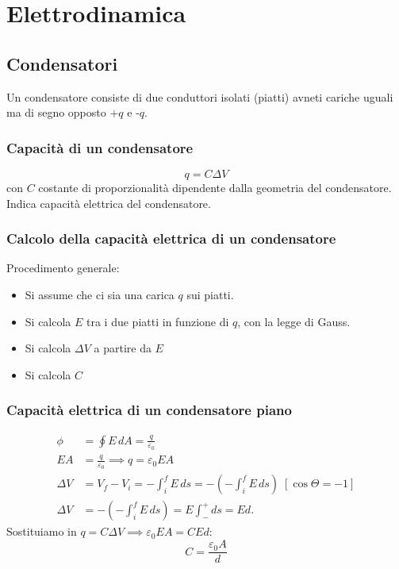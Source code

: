 \chapter{Elettrodinamica}

    \section{Condensatori} Un condensatore consiste di due conduttori isolati
    (piatti) avneti cariche uguali ma di segno opposto $+q$ e -$q$.

        \subsection{Capacità di un condensatore}
            \begin{equation}
                q = C\Delta V
            \end{equation}
        con $C$ costante di proporzionalità dipendente dalla geometria del 
        condensatore. Indica capacità elettrica del condensatore.
        
        \subsection{Calcolo della capacità elettrica di un condensatore} 
        Procedimento generale:
            \begin{itemize}
                \item Si assume che ci sia una carica $q$ sui piatti.
                \item Si calcola $E$ tra i due piatti in funzione di $q$, con 
                la legge di Gauss.
                \item Si calcola $\Delta V$ a partire da $E$
                \item Si calcola $C$
            \end{itemize}
        
        \subsection{Capacità elettrica di un condensatore piano}
            \begin{align*}
                \phi &= \oint E \, dA = \frac{q}{\varepsilon_0} \\
                EA &= \frac{q}{\varepsilon_0} \implies q = \varepsilon_0 E A \\
                \Delta V &= V_f - V_i = -\int_{i}^{f} E \, ds 
                        = -(-\int_{i}^{f} E \, ds) \; [\cos\Theta = -1]\\
                \Delta V &= -(-\int_{i}^{f} E \, ds) = E \int_{-}^{+} ds = Ed.
            \end{align*}
        Sostituiamo in $q = C\Delta V \implies \varepsilon_0EA = CEd$:
            \begin{equation}
                C = \frac{\varepsilon_0A}{d}
            \end{equation}

